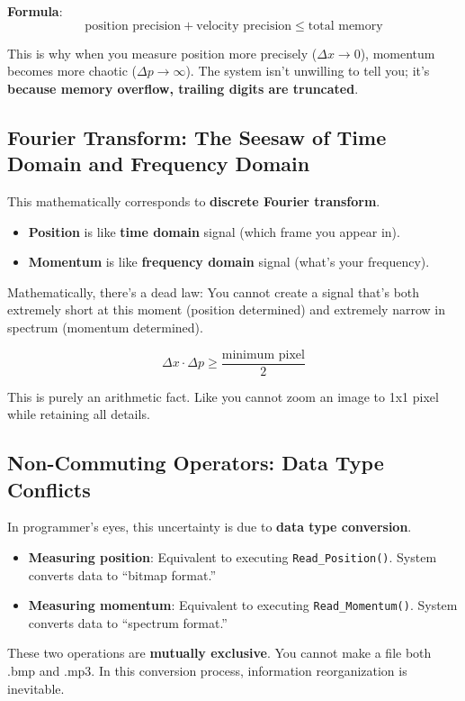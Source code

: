 \textbf{Formula}:
\[
\text{position precision} + \text{velocity precision} \le \text{total memory}
\]

This is why when you measure position more precisely ($\Delta x \to 0$), momentum becomes more chaotic ($\Delta p \to \infty$). The system isn't unwilling to tell you; it's \textbf{because memory overflow, trailing digits are truncated}.

\subsection{Fourier Transform: The Seesaw of Time Domain and Frequency Domain}

This mathematically corresponds to \textbf{discrete Fourier transform}.

\begin{itemize}
\item \textbf{Position} is like \textbf{time domain} signal (which frame you appear in).
\item \textbf{Momentum} is like \textbf{frequency domain} signal (what's your frequency).
\end{itemize}

Mathematically, there's a dead law: You cannot create a signal that's both extremely short at this moment (position determined) and extremely narrow in spectrum (momentum determined).

\[
\Delta x \cdot \Delta p \ge \frac{\text{minimum pixel}}{2}
\]

This is purely an arithmetic fact. Like you cannot zoom an image to 1x1 pixel while retaining all details.

\subsection{Non-Commuting Operators: Data Type Conflicts}

In programmer's eyes, this uncertainty is due to \textbf{data type conversion}.

\begin{itemize}
\item \textbf{Measuring position}: Equivalent to executing \texttt{Read\_Position()}. System converts data to ``bitmap format.''
\item \textbf{Measuring momentum}: Equivalent to executing \texttt{Read\_Momentum()}. System converts data to ``spectrum format.''
\end{itemize}

These two operations are \textbf{mutually exclusive}. You cannot make a file both .bmp and .mp3. In this conversion process, information reorganization is inevitable.

